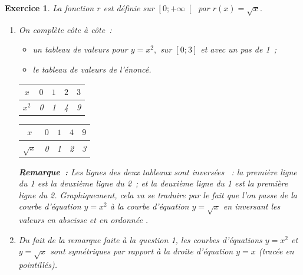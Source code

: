 \documentclass[10pt]{article}
\newtheorem{exo}{Exercice}
\begin{document}
\begin{exo}



La fonction $r$ est définie sur $\left[0;+\infty\right[$ par $r(x)=\sqrt{x}.$ 

\begin{enumerate}
\item On complète côte à côte~:

\begin{itemize}
\item[\textbullet] un tableau de valeurs pour $y=x^2,$ sur $\left[0;3\right]$ et avec un pas de 1~;
\item[\textbullet] le tableau de valeurs de l'énoncé.
\end{itemize}

\medskip

\setlength{\columnseprule}{1pt}


\begin{multicols}{2}

\begin{center}

\begin{tabular}{|c|c|c|c|c|}
\hline
	$x$& $0$&$1$&$2$&$3$	\\\hline

$x^2$&0&1&4&9\\\hline
\end{tabular}
\end{center}

\columnbreak

\begin{center}

\begin{tabular}{|c|c|c|c|c|}
\hline
	$x$& $0$&$1$&$4$&$9$	\\\hline

$\sqrt{x}$&0&1&2&3\\\hline
\end{tabular}

\end{center}

\end{multicols}

\medskip

\textbf{Remarque~:} Les lignes des deux tableaux sont \og inversées \fg~: la première ligne du 1 est la deuxième ligne du 2~; et la deuxième ligne du 1 est la première ligne du 2. Graphiquement, cela va se traduire par le fait que l'on passe de la courbe d'équation $y=x^2$ à la courbe d'équation $y=\sqrt{x}$ \og en inversant les valeurs en abscisse et en ordonnée \fg.
\item Du fait de la remarque faite à la question 1, les courbes d'équations $y=x^2$ et $y=\sqrt{x}$ sont symétriques par rapport à la droite d'équation $y=x$ (tracée en pointillés).


\end{enumerate}
\end{exo}
\end{document}
